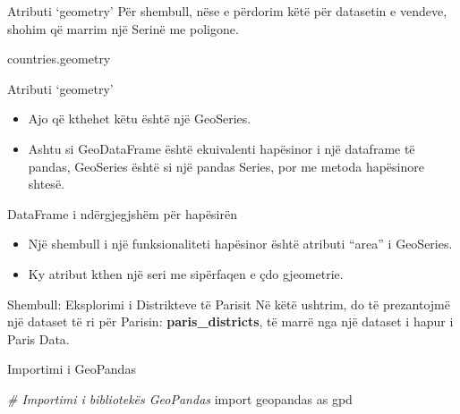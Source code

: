 \documentclass[
  ignorenonframetext,
]{beamer}
\newenvironment{Shaded}{\begin{snugshade}}{\end{snugshade}}
\newcommand{\CommentTok}[1]{\textcolor[rgb]{0.56,0.35,0.01}{\textit{#1}}}
\newcommand{\ImportTok}[1]{#1}
\newcommand{\NormalTok}[1]{#1}
\begin{document}
\begin{frame}[fragile]{Atributi `geometry'}
\protect\hypertarget{atributi-geometry-1}{}
Për shembull, nëse e përdorim këtë për datasetin e vendeve, shohim që
marrim një Serinë me poligone.


\begin{Shaded}
\begin{Highlighting}[]
\NormalTok{countries.geometry}
\end{Highlighting}
\end{Shaded}
\end{frame}

\begin{frame}{Atributi `geometry'}
\protect\hypertarget{atributi-geometry-2}{}
\begin{itemize}
\item
  Ajo që kthehet këtu është një GeoSeries.
\item
  Ashtu si GeoDataFrame është ekuivalenti hapësinor i një dataframe të
  pandas, GeoSeries është si një pandas Series, por me metoda hapësinore
  shtesë.
\end{itemize}
\end{frame}

\begin{frame}{DataFrame i ndërgjegjshëm për hapësirën}
\protect\hypertarget{dataframe-i-nduxebrgjegjshuxebm-puxebr-hapuxebsiruxebn}{}
\begin{itemize}
\item
  Një shembull i një funksionaliteti hapësinor është atributi ``area'' i
  GeoSeries.
\item
  Ky atribut kthen një seri me sipërfaqen e çdo gjeometrie.
\end{itemize}
\end{frame}

\begin{frame}{Shembull: Eksplorimi i Distrikteve të Parisit}
\protect\hypertarget{shembull-eksplorimi-i-distrikteve-tuxeb-parisit}{}
Në këtë ushtrim, do të prezantojmë një dataset të ri për Parisin:
\textbf{paris\_districts}, të marrë nga një dataset i hapur i Paris
Data.
\end{frame}

\begin{frame}[fragile]{Importimi i GeoPandas}
\protect\hypertarget{importimi-i-geopandas}{}

\begin{Shaded}
\begin{Highlighting}[]
\CommentTok{\# Importimi i bibliotekës GeoPandas}
\ImportTok{import}\NormalTok{ geopandas }\ImportTok{as}\NormalTok{ gpd}
\end{Highlighting}
\end{Shaded}
\end{frame}
\end{document}
